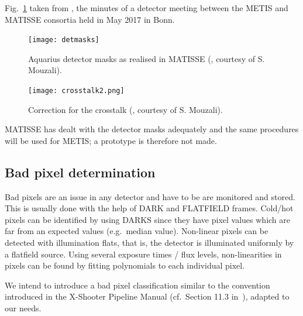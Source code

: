 Fig.~\ref{fig:detmasks} taken from \cite{matisse_minutes}, the minutes
of a detector meeting between the METIS and MATISSE consortia held in May 2017 in Bonn.
\begin{figure}[ht]
  \centering
  \texttt{[image: detmasks]}
  \caption[Aquarius detector masks]{Aquarius detector masks as
    realised in MATISSE (\cite{matisse_minutes}, courtesy of
    S. Mouzali).}
  \label{fig:detmasks}
\end{figure}



\begin{figure}[ht]
  \centering
  \texttt{[image: crosstalk2.png]}
  \caption[Detector crosstalk correction]{Correction for the crosstalk
    (\cite{matisse_minutes}, courtesy of S. Mouzali).}
  \label{fig:crosstalk2}
\end{figure}

MATISSE has dealt with the detector masks adequately and the same procedures will be used for METIS; a prototype is therefore not made.


\subsection{Bad pixel determination}\label{ssec:criticalbadpixeldetermination}

Bad pixels are an issue in any detector and have to be are monitored and stored.
This is usually done with the help of DARK and FLATFIELD frames.
Cold/hot pixels can be identified by using DARKS since they have pixel values which are far from an expected values (e.g.\ median value).
Non-linear pixels can be detected with illumination flats, that is, the detector is illuminated uniformly by a flatfield source.
Using  several exposure times / flux levels, non-linearities in pixels can be found by fitting polynomials to each  individual pixel.

We intend to introduce a bad pixel classification similar to the convention introduced in the X-Shooter Pipeline Manual (cf.\ Section 11.3 in~\cite{xshooter_manual}), adapted to our needs.

